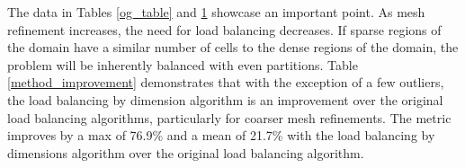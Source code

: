 {\begin{table}[H]
{\begin{tabular}{c|c|c|c|c|c|c|c|c|c}
\end{tabular}}
\label{all_improvements}
\end{table}

The data in Tables \ref{og_table} and \ref{all_improvements} showcase an important point. As mesh refinement increases, the need for load balancing decreases. If sparse regions of the domain have a similar number of cells to the dense regions of the domain, the problem will be inherently balanced with even partitions. Table \ref{method_improvement} demonstrates that with the exception of a few outliers, the load balancing by dimension algorithm is an improvement over the original load balancing algorithms, particularly for coarser mesh refinements. The metric improves by a max of 76.9\% and a mean of 21.7\%  with the load balancing by dimensions algorithm over the original load balancing algorithm.

}
